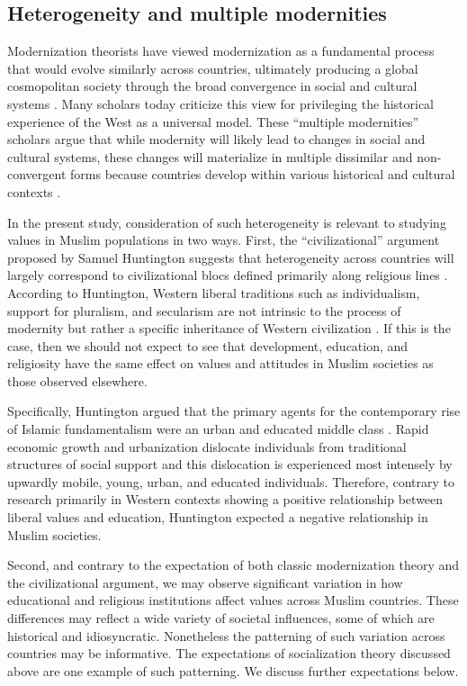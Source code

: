 \documentclass[10pt,letterpaper]{article}
\begin{document}
\subsection*{Heterogeneity and multiple modernities}

Modernization theorists have viewed modernization as a fundamental
process that would evolve similarly across countries, ultimately
producing a global cosmopolitan society through the broad convergence in
social and cultural systems \cite{fukuyama_end_1992}. Many scholars
today criticize this view for privileging the historical experience of
the West as a universal model. These ``multiple modernities'' scholars
argue that while modernity will likely lead to changes in social and
cultural systems, these changes will materialize in multiple dissimilar
and non-convergent forms because countries develop within various
historical and cultural contexts
\cite{hefner_multiple_1998, eisenstadt_multiple_2000, kamali_multiple_2006, casanova_cosmopolitanism_2011}.

In the present study, consideration of such heterogeneity is relevant to
studying values in Muslim populations in two ways. First, the
``civilizational'' argument proposed by Samuel Huntington
suggests that heterogeneity across countries will largely correspond to
civilizational blocs defined primarily along religious lines \cite{huntington_clash_1996}. According
to Huntington, Western liberal traditions such as individualism, support
for pluralism, and secularism are not intrinsic to the process of
modernity but rather a specific inheritance of Western civilization
\cite[pp.~69-72, 114]{huntington_clash_1996}. If this is the case, then
we should not expect to see that development, education, and religiosity
have the same effect on values and attitudes in Muslim societies as
those observed elsewhere.

Specifically, Huntington argued that the primary agents for the
contemporary rise of Islamic fundamentalism were an urban and educated
middle class \cite[pp.~112-113]{huntington_clash_1996}. Rapid economic
growth and urbanization dislocate individuals from traditional
structures of social support and this dislocation is experienced most
intensely by upwardly mobile, young, urban, and educated individuals.
Therefore, contrary to research primarily in Western contexts showing a
positive relationship between liberal values and education, Huntington
expected a negative relationship in Muslim societies.

Second, and contrary to the expectation of both classic modernization
theory and the civilizational argument, we may observe significant
variation in how educational and religious institutions affect values
across Muslim countries. These differences may reflect a wide variety of
societal influences, some of which are historical and idiosyncratic.
Nonetheless the patterning of such variation across countries may be
informative. The expectations of socialization theory discussed above
are one example of such patterning. We discuss further expectations
below.
\end{document}
